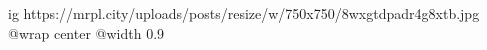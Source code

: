  
 
 
 
 

\ifcmt
  ig https://mrpl.city/uploads/posts/resize/w/750x750/8wxgtdpadr4g8xtb.jpg
  @wrap center
  @width 0.9
\fi
